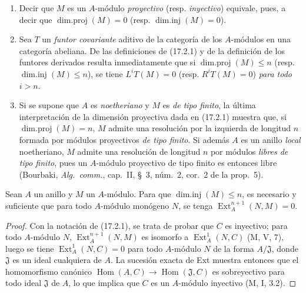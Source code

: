 \begin{remarks}[17.2.2]
\label{0.17.2.2-es}
\begin{enumerate}
  \item[\rm (i)] Decir que $M$ es un $A$-módulo \emph{proyectivo} (resp.
  \emph{inyectivo}) equivale, pues, a decir que
  $\operatorname{dim.proj}(M)=0$ (resp. $\operatorname{dim.inj}(M)=0$).
  \item[\rm (ii)] Sea $T$ un \emph{funtor covariante} aditivo de la categoría
  de los $A$-módulos en una categoría abeliana. De las definiciones de
  (17.2.1) y de la definición de los
  funtores derivados resulta inmediatamente que si $\operatorname{dim.proj}(M)\leq n$ (resp.
  $\operatorname{dim.inj}(M)\leq n$), se tiene $L^iT(M)=0$ (resp.
  $R^iT(M)=0$) \emph{para todo $i>n$}.
  \item[\rm (iii)] Si se supone que $A$ es \emph{noetheriano} y $M$ es \emph{de tipo
  finito}, la última interpretación de la dimensión proyectiva dada en
  (17.2.1) muestra que, si $\operatorname{dim.proj}(M)=n$, $M$ admite una
  resolución por la izquierda de longitud $n$ formada por módulos proyectivos \emph{de tipo
  finito}. Si además $A$ es un anillo \emph{local} noetheriano, $M$ admite una
  resolución de longitud $n$ por módulos \emph{libres de tipo finito}, pues un
  $A$-módulo proyectivo de tipo finito es entonces libre (Bourbaki,
  \emph{Alg.~comm.}, cap.~II, \S~3, núm.~2, cor.~2 de la prop.~5).
\end{enumerate}
\end{remarks}

\begin{lemma}[17.2.3]
\label{0.17.2.3-es}
Sean $A$ un anillo y $M$ un $A$-módulo. Para que
$\operatorname{dim.inj}(M)\leq n$, es necesario y suficiente que para todo
$A$-módulo \textup{monógeno} $N$, se tenga $\operatorname{Ext}^{n+1}_A(N,M)=0$.
\end{lemma}

\begin{proof}
Con la notación de (17.2.1), se trata de probar que $C$ es inyectivo;
para todo $A$-módulo $N$, $\operatorname{Ext}^{n+1}_A(N,M)$ es isomorfo a
$\operatorname{Ext}^1_A(N,C)$ (M, V, 7), luego se tiene
$\operatorname{Ext}^1_A(N,C)=0$ para todo $A$-módulo $N$ de la forma
$A/\mathfrak{J}$, donde $\mathfrak{J}$ es un ideal cualquiera de $A$. La sucesión
exacta de Ext muestra entonces que el homomorfismo canónico
$\operatorname{Hom}(A,C)\longrightarrow\operatorname{Hom}(\mathfrak{J},C)$ es
sobreyectivo para todo ideal $\mathfrak{J}$ de $A$, lo que implica que $C$ es un
$A$-módulo inyectivo (M, I, 3.2).
\end{proof}

